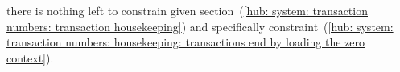 \item[\underline{\underline{\zeroContext{} context-row n$^°~\bm{(i + \locTxSkipSenderAccountRowOffset)}$:}}]
	there is nothing left to constrain given
	section~(\ref{hub: system: transaction numbers: transaction housekeeping}) and specifically
	constraint~(\ref{hub: system: transaction numbers: housekeeping: transactions end by loading the zero context}).
